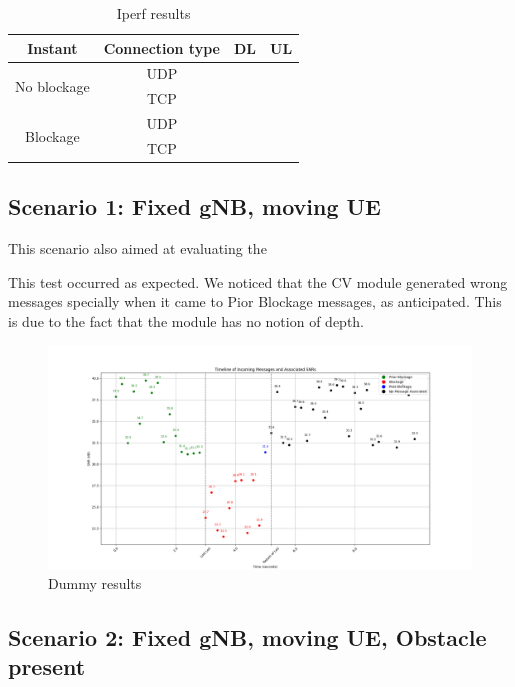 \begin{table}[h]
    \centering %
    \begin{tabular}{|c|c|c|c|}
        \hline
        \textbf{Instant} & \textbf{Connection type} & \textbf{DL} & \textbf{UL} \\ \hline
        \multirow{2}{*}{No blockage} & UDP & & \\ \cline{2-4}
        & TCP & & \\ \hline
        \multirow{2}{*}{Blockage}    & UDP & & \\ \cline{2-4}
        & TCP & & \\ \hline
    \end{tabular}
    \caption{Iperf results} %
    \label{tab:iperf} %
\end{table}


\subsection{Scenario 1: Fixed gNB, moving UE}\label{subsec:scenario-0.1:-fixed-gnb-moving-ue}
This scenario also aimed at evaluating the

This test occurred as expected.
We noticed that the CV module generated wrong messages specially when it came to Pior Blockage messages, as anticipated.
This is due to the fact that the module has no notion of depth.

\begin{figure}[H]
    \centering
    \includegraphics[width=\linewidth]{figures/dummy results}
    \caption{Dummy results}
    \label{fig:results_1}
\end{figure}

\subsection{Scenario 2: Fixed gNB, moving UE, Obstacle present}\label{subsec:scenario-0.1:-fixed-gnb-moving-ue-obstacle-present}

